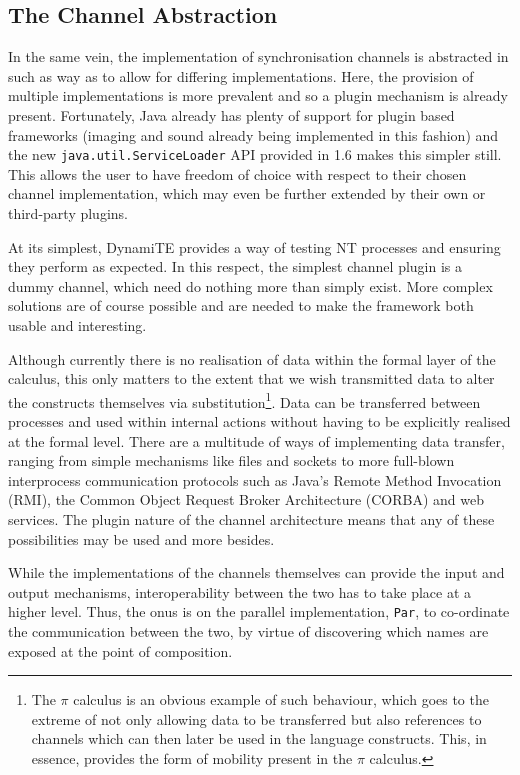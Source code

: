 \subsection{The Channel Abstraction}
\label{dyn:channels}

In the same vein, the implementation of synchronisation channels is
abstracted in such as way as to allow for differing implementations.
Here, the provision of multiple implementations is more prevalent and so
a plugin mechanism is already present.  Fortunately, Java already has
plenty of support for plugin based frameworks (imaging and sound already
being implemented in this fashion) and the new
\texttt{java.util.ServiceLoader} API provided in 1.6 makes this simpler
still.  This allows the user to have freedom of choice with respect to
their chosen channel implementation, which may even be further extended
by their own or third-party plugins.

At its simplest, DynamiTE provides a way of testing NT processes and
ensuring they perform as expected.  In this respect, the simplest
channel plugin is a dummy channel, which need do nothing more than
simply exist.  More complex solutions are of course possible and are
needed to make the framework both usable and interesting.  

Although currently there is no realisation of data within the formal
layer of the calculus, this only matters to the extent that we wish
transmitted data to alter the constructs themselves via
substitution\footnote{The $\pi$ calculus \cite{picalctutorial} is an
obvious example of such behaviour, which goes to the extreme of not only
allowing data to be transferred but also references to channels which
can then later be used in the language constructs.  This, in essence,
provides the form of mobility present in the $\pi$ calculus.}.  Data can
be transferred between processes and used within internal actions
without having to be explicitly realised at the formal level.  There are
a multitude of ways of implementing data transfer, ranging from simple
mechanisms like files and sockets to more full-blown interprocess
communication protocols such as Java's Remote Method Invocation (RMI),
the Common Object Request Broker Architecture (CORBA) and web services.
The plugin nature of the channel architecture means that any of these
possibilities may be used and more besides.

While the implementations of the channels themselves can provide the
input and output mechanisms, interoperability between the two has to
take place at a higher level.  Thus, the onus is on the parallel
implementation, \texttt{Par}, to co-ordinate the communication between
the two, by virtue of discovering which names are exposed at the point
of composition.

